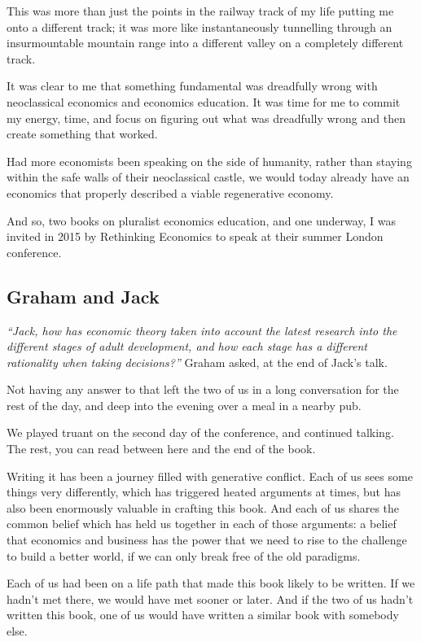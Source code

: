 This was more than just the points in the railway track of my life putting me onto a different track; it was more like instantaneously tunnelling through an insurmountable mountain range into a different valley on a completely different track. 


It was clear to me that something fundamental was dreadfully wrong with neoclassical economics and economics education. It was time for me to commit my energy, time, and focus on figuring out what was dreadfully wrong and then create something that worked. 


Had more economists been speaking on the side of humanity, rather than staying within the safe walls of their neoclassical castle, we would today already have an economics that properly described a viable regenerative economy.


And so, two books on pluralist economics education, and one underway, I was invited in 2015 by Rethinking Economics to speak at their summer London conference.




\subsection*{Graham and Jack}


\emph{“Jack, how has economic theory taken into account the latest research into the different stages of adult development, and how each stage has a different rationality when taking decisions?”} Graham asked, at the end of Jack's talk. 


Not having any answer to that left the two of us in a long conversation for the rest of the day, and deep into the evening over a meal in a nearby pub.


We played truant on the second day of the conference, and continued talking. The rest, you can read between here and the end of the book.


Writing it has been a journey filled with generative conflict. Each of us sees some things very differently, which has triggered heated arguments at times, but has also been enormously valuable in crafting this book. And each of us shares the common belief which has held us together in each of those arguments: a belief that economics and business has the power that we need to rise to the challenge to build a better world, if we can only break free of the old paradigms.


Each of us had been on a life path that made this book likely to be written. If we hadn't met there, we would have met sooner or later. And if the two of us hadn't written this book, one of us would have written a similar book with somebody else. 


